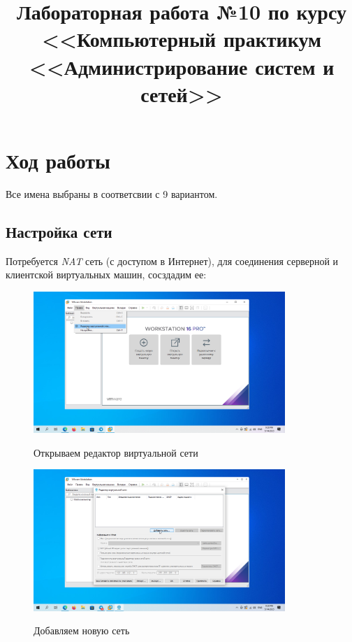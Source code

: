 \documentclass[a4paper]{article}
\title{
  Лабораторная работа №10 по курсу \\
  <<Компьютерный практикум <<Администрирование систем и сетей>>  
}
\begin{document}
  \templatedtitlepage
  
  \toc
  \section{Ход работы}

  Все имена выбраны в соответсвии с 9 вариантом.

  \subsection{Настройка сети}

  Потребуется \textit{NAT} сеть (с доступом в Интернет), для соединения
  серверной и клиентской виртуальных машин, сосздадим ее:

  \begin{figure}[H]
    \centering
    \includegraphics[width=0.85\textwidth]{5_0002}
    \label{img:2}
    \caption{Открываем редактор виртуальной сети}
  \end{figure}

  \begin{figure}[H]
    \centering
    \includegraphics[width=0.85\textwidth]{5_0003}
    \label{img:3}
    \caption{Добавляем новую сеть}
  \end{figure}
\end{document}
